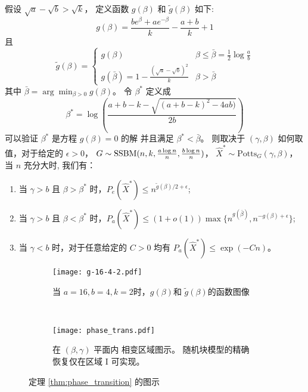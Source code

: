 \begin{theorem}\label{thm:phase_transition}
	假设 $\sqrt{a} - \sqrt{b} > \sqrt{k}$，
	定义函数 $g(\beta)$ 和 $ \tilde{g}(\beta)$ 如下:
	\begin{equation}
		\label{eq:g_beta_main_article}
		g(\beta) = \frac{be^{\beta} + a e^{-\beta}}{k} - \frac{a+b}{k} +1
	\end{equation}
	且
	\begin{equation}
		\label{eq:g_tilde_beta_main_article}
	\tilde{g}(\beta) = \begin{cases}
	g(\beta) & \beta \leq \bar{\beta} = \frac{1}{2}\log \frac{a}{b} \\
	g(\bar{\beta}) = 1 - \frac{(\sqrt{a} - \sqrt{b})^2}{k} & \beta > \bar{\beta}
	\end{cases}
	\end{equation}
	其中
	$\bar{\beta} =  \displaystyle\arg\min_{\beta > 0} g(\beta)$。
	令 $\beta^*$ 定义成
	\begin{equation}\label{eq:beta_star}
	\beta^* = \log\left(\frac{a + b - k - \sqrt{(a + b - k)^2 - 4 a b)}}{2  b}\right)
	\end{equation}
	可以验证 $\beta^*$ 是方程 $g(\beta) = 0$ 的解 并且满足  $\beta^* < \bar{\beta}$。
	则取决于 $(\gamma, \beta)$ 如何取值，对于给定的 $\epsilon > 0$， 
	$G\sim \operatorname{SSBM}(n, k, \frac{a \log n}{n}, \frac{b \log n}{n})$， $\hat{X}^* \sim \textrm{Potts}_G(\gamma, \beta)$，
	当 $n$ 充分大时, 我们有：
	\begin{enumerate}
	\item 当 $\gamma > b$ 且 $\beta > \beta^*$ 时，$P_e(\hat{X}^*) \leq n^{\tilde{g}(\beta)/2 + \epsilon}$;
	\item 当 $\gamma > b$ 且 $\beta < \beta^*$ 时，$P_a(\hat{X}^*) \leq (1+o(1))\max\{n^{g(\bar{\beta})}, n^{-g(\beta) + \epsilon}\}$;
	\item 当 $\gamma < b$ 时，对于任意给定的 $C>0$	均有 $P_a(\hat{X}^*) \leq \exp(-C n)$。
	\end{enumerate}
\end{theorem}

\begin{figure}[H]
	\begin{subfigure}{0.43\textwidth}
		\texttt{[image: g-16-4-2.pdf]}
		\caption{当 $a=16,b=4,k=2$时，$g(\beta)$和
		$\tilde{g}(\beta)$的函数图像}\label{fig:g}
	\end{subfigure}~
	\begin{subfigure}{0.55\textwidth}
		\texttt{[image: phase\_trans.pdf]}
		\caption{
			在 $(\beta, \gamma)$ 平面内
			相变区域图示。
			随机块模型的精确
			恢复仅在区域 I 可实现。}\label{fig:pt}
	\end{subfigure}
	\caption{定理 \ref{thm:phase_transition}
	的图示}
	\label{fig:phase_transition_theorem_illustration}
\end{figure}

